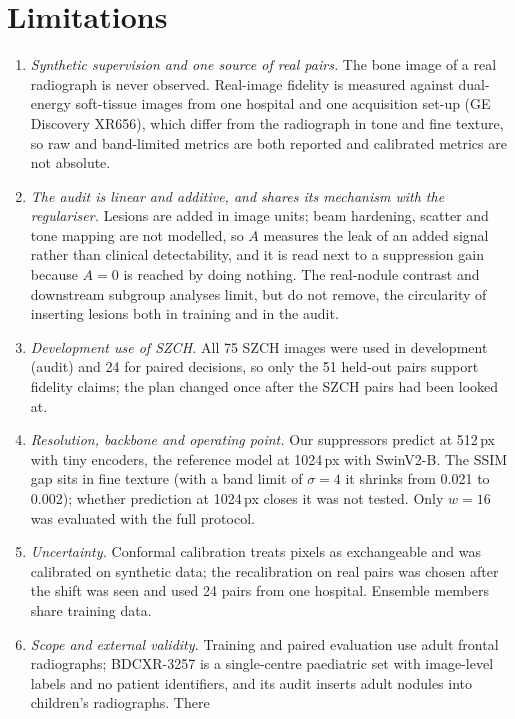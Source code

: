 \section{Limitations}
\label{sec:limitations}
\begin{enumerate}
\item \emph{Synthetic supervision and one source of real pairs.} The bone image of a real radiograph is never observed. Real-image fidelity
 is measured against dual-energy soft-tissue images from one hospital and one acquisition set-up (GE Discovery XR656), which differ from the
 radiograph in tone and fine texture, so raw and band-limited metrics are both reported and calibrated metrics are not absolute.
\item \emph{The audit is linear and additive, and shares its mechanism with the regulariser.} Lesions are added in image units; beam
 hardening, scatter and tone mapping are not modelled, so $A$ measures the leak of an added signal rather than clinical detectability, and it
 is read next to a suppression gain because $A=0$ is reached by doing nothing. The real-nodule contrast and downstream subgroup analyses
 limit, but do not remove, the circularity of inserting lesions both in training and in the audit.
\item \emph{Development use of SZCH.} All 75 SZCH images were used in development (audit) and 24 for paired decisions, so only the 51
 held-out pairs support fidelity claims; the plan changed once after the SZCH pairs had been looked at.
\item \emph{Resolution, backbone and operating point.} Our suppressors predict at 512\,px with tiny encoders, the reference model at
 1024\,px with SwinV2-B. The SSIM gap sits in fine texture (with a band limit of $\sigma=4$ it shrinks from 0.021 to 0.002); whether
 prediction at 1024\,px closes it was not tested. Only $w=16$ was evaluated with the full protocol.
\item \emph{Uncertainty.} Conformal calibration treats pixels as exchangeable and was calibrated on synthetic data; the recalibration on real
 pairs was chosen after the shift was seen and used 24 pairs from one hospital. Ensemble members share training data.
\item \emph{Scope and external validity.} Training and paired evaluation use adult frontal radiographs; BDCXR-3257 is a single-centre
 paediatric set with image-level labels and no patient identifiers, and its audit inserts adult nodules into children's radiographs. There

\end{enumerate}
